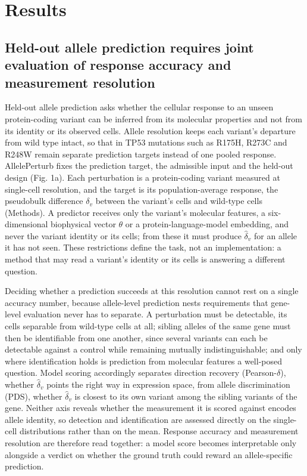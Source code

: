 \documentclass[11pt,letterpaper]{article}
\begin{document}
\section*{Results}

\subsection*{Held-out allele prediction requires joint evaluation of response accuracy and measurement resolution}

Held-out allele prediction asks whether the cellular response to an unseen protein-coding variant can be inferred from its molecular properties and not from its identity or its observed cells. Allele resolution keeps each variant's departure from wild type intact, so that in TP53 mutations such as R175H, R273C and R248W remain separate prediction targets instead of one pooled response. AllelePerturb fixes the prediction target, the admissible input and the held-out design (Fig. 1a). Each perturbation is a protein-coding variant measured at single-cell resolution, and the target is its population-average response, the pseudobulk difference $\delta_v$ between the variant's cells and wild-type cells (Methods). A predictor receives only the variant's molecular features, a six-dimensional biophysical vector $\theta$ or a protein-language-model embedding, and never the variant identity or its cells; from these it must produce $\hat{\delta}_v$ for an allele it has not seen. These restrictions define the task, not an implementation: a method that may read a variant's identity or its cells is answering a different question.

Deciding whether a prediction succeeds at this resolution cannot rest on a single accuracy number, because allele-level prediction nests requirements that gene-level evaluation never has to separate. A perturbation must be detectable, its cells separable from wild-type cells at all; sibling alleles of the same gene must then be identifiable from one another, since several variants can each be detectable against a control while remaining mutually indistinguishable; and only where identification holds is prediction from molecular features a well-posed question. Model scoring accordingly separates direction recovery (Pearson-$\delta$), whether $\hat{\delta}_v$ points the right way in expression space, from allele discrimination (PDS), whether $\hat{\delta}_v$ is closest to its own variant among the sibling variants of the gene. Neither axis reveals whether the measurement it is scored against encodes allele identity, so detection and identification are assessed directly on the single-cell distributions rather than on the mean. Response accuracy and measurement resolution are therefore read together: a model score becomes interpretable only alongside a verdict on whether the ground truth could reward an allele-specific prediction.
\end{document}
